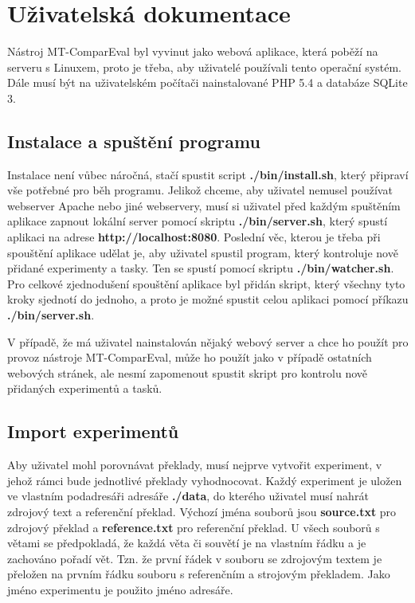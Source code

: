 \chapter{Uživatelská dokumentace}
\label{chap:users}

Nástroj MT-ComparEval byl vyvinut jako webová aplikace,
  která poběží na serveru s Linuxem,
  proto je třeba,
  aby uživatelé používali tento operační systém.
Dále musí být na uživatelském počítači nainstalované PHP 5.4 a databáze SQLite 3.

\section{Instalace a spuštění programu}
Instalace není vůbec náročná,
  stačí spustit script \textbf{./bin/install.sh},
  který připraví vše potřebné pro běh programu. 
Jelikož chceme,
  aby uživatel nemusel používat webserver Apache nebo jiné webservery,
  musí si uživatel před každým spuštěním aplikace zapnout lokální server pomocí skriptu \textbf{./bin/server.sh},
  který spustí aplikaci na adrese \textbf{http://localhost:8080}.
Poslední věc,
  kterou je třeba při spouštění aplikace udělat je,
  aby uživatel spustil program,
  který kontroluje nově přidané experimenty a tasky.
Ten se spustí pomocí skriptu \textbf{./bin/watcher.sh}.
Pro celkové zjednodušení spouštění aplikace byl přidán skript,
  který všechny tyto kroky sjednotí do jednoho,
  a proto je možné spustit celou aplikaci pomocí příkazu \textbf{./bin/server.sh}.

V případě, že má uživatel nainstalován nějaký webový server
  a chce ho použít pro provoz nástroje MT-ComparEval,
  může ho použít jako v případě ostatních webových stránek,
  ale nesmí zapomenout spustit skript pro kontrolu nově přidaných experimentů a tasků.

\section{Import experimentů}
Aby uživatel mohl porovnávat překlady,
  musí nejprve vytvořit experiment,
  v jehož rámci bude jednotlivé překlady vyhodnocovat.
Každý experiment je uložen ve vlastním podadresáři adresáře \textbf{./data},
  do kterého uživatel musí nahrát zdrojový text a referenční překlad.
Výchozí jména souborů jsou \textbf{source.txt} pro zdrojový překlad
  a \textbf{reference.txt} pro referenční překlad.
U všech souborů s větami se předpokladá,
  že každá věta či souvětí je na vlastním řádku
  a je zachováno pořadí vět.
Tzn. že první řádek v souboru se zdrojovým textem je přeložen na prvním řádku souboru s referenčním a strojovým překladem.
Jako jméno experimentu je použito jméno adresáře.

